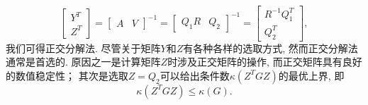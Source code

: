 \documentclass{SBCbookchapter}
\numberwithin{equation}{section}
\begin{document}
\begin{equation*}
\begin{bmatrix} Y^T \\ Z^T \end{bmatrix} = \begin{bmatrix} A & V \end{bmatrix}^{-1} = \begin{bmatrix} Q_1R & Q_2 \end{bmatrix}^{-1} = \begin{bmatrix} R^{-1} Q_1^T \\ Q_2^T \end{bmatrix},
\end{equation*}
我们可得正交分解法. 尽管关于矩阵$Y$和$Z$有各种各样的选取方式, 然而正交分解法通常是首选的. 原因之一是计算矩阵$Z$时涉及正交矩阵的操作, 而正交矩阵具有良好的数值稳定性； 其次是选取$Z = Q_2$可以给出条件数$\kappa(Z^T G Z)$的最优上界, 即
\begin{equation*}
\kappa(Z^T G Z) \leqslant \kappa(G).
\end{equation*}
\end{document}
